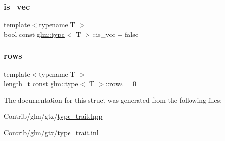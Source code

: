 \subsubsection{\texorpdfstring{is\+\_\+vec}{is\_vec}}
{\footnotesize\ttfamily template$<$typename T $>$ \\
bool const \mbox{\hyperlink{structglm_1_1type}{glm\+::type}}$<$ T $>$\+::is\+\_\+vec = false\hspace{0.3cm}{\ttfamily [static]}}

\mbox{\label{structglm_1_1type_ad04a64a448a28061ed81f90f0f52b691}} 
\subsubsection{\texorpdfstring{rows}{rows}}
{\footnotesize\ttfamily template$<$typename T $>$ \\
\mbox{\hyperlink{namespaceglm_a090a0de2260835bee80e71a702492ed9}{length\+\_\+t}} const \mbox{\hyperlink{structglm_1_1type}{glm\+::type}}$<$ T $>$\+::rows = 0\hspace{0.3cm}{\ttfamily [static]}}



The documentation for this struct was generated from the following files\+:\begin{DoxyCompactItemize}
\item 
Contrib/glm/gtx/\mbox{\hyperlink{type__trait_8hpp}{type\+\_\+trait.\+hpp}}\item 
Contrib/glm/gtx/\mbox{\hyperlink{type__trait_8inl}{type\+\_\+trait.\+inl}}\end{DoxyCompactItemize}
